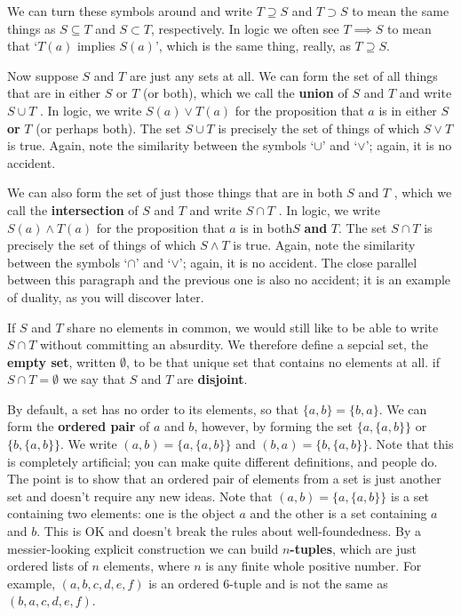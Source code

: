 \documentclass[oneside,english]{amsbook}
\numberwithin{section}{chapter}
\theoremstyle{plain}
\theoremstyle{definition}
\begin{document}
We can turn these symbols around and write $T\supseteq S$ and $T\supset S$ to mean the same things as $S\subseteq T$ and $S\subset T$, respectively. In logic we often see $T\implies S$ to mean that `$T(a)$ implies $S(a)$', which is the same thing, really, as $T\supseteq S$.

Now suppose $S$ and $T$ are just any sets at all. We can form the set of all things that are in either $S$ or $T$ (or both), which we call the \textbf{union }of \textbf{$S$} and $T$ and write $S\cup T$ . In logic, we write $S(a)\lor T(a)$ for the proposition that $a$ is in either $S$ \textbf{or} $T$ (or perhaps both). The set $S\cup T$ is precisely the set of things of which $S\lor T$ is true. Again, note the similarity between the symbols `$\cup$' and `$\lor$'; again, it is no accident.

We can also form the set of just those things that are in both $S$ and $T$ , which we call the \textbf{intersection }of \textbf{$S$} and $T$ and write $S\cap T$ . In logic, we write $S(a)\land T(a)$ for the proposition that $a$ is in both$S$ \textbf{and} $T$. The set $S\cap T$ is precisely the set of things of which $S\land T$ is true. Again, note the similarity between the symbols `$\cap$' and `$\lor$'; again, it is no accident. The close parallel between this paragraph and the previous one is also no accident; it is an example of duality, as you will discover later.

If $S$ and $T$ share no elements in common, we would still like to be able to write $S\cap T$ without committing an absurdity. We therefore define a sepcial set, the \textbf{empty set}, written $\emptyset$, to be that unique set that contains no elements at all. if $S\cap T=\emptyset$ we say that $S$ and $T$ are \textbf{disjoint}. 

By default, a set has no order to its elements, so that $\{a,b\}=\{b,a\}$. We can form the \textbf{ordered pair }of $a$ and $b$, however, by forming the set $\{a,\{a,b\}\}$ or $\{b,\{a,b\}\}$. We write $(a,b)=\{a,\{a,b\}\}$ and $(b,a)=\{b,\{a,b\}\}$. Note that this is completely artificial; you can make quite different definitions, and people do. The point is to show that an ordered pair of elements from a set is just another set and doesn't require any new ideas. Note that $(a,b)=\{a,\{a,b\}\}$ is a set containing two elements: one is the object $a$ and the other is a set containing $a$ and $b$. This is OK and doesn't break the rules about well-foundedness. By a messier-looking explicit construction we can build $n$\textbf{-tuples}, which are just ordered lists of $n$ elements, where $n$ is any finite whole positive number. For example, $(a,b,c,d,e,f)$ is an ordered 6-tuple and is not the same as $(b,a,c,d,e,f)$.
\end{document}
